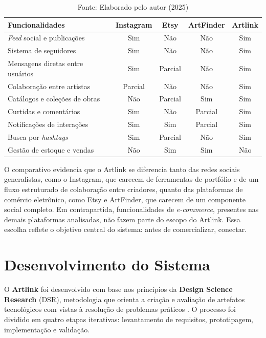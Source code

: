 \documentclass[a4paper, 12pt, oneside]{article}
\begin{document}
\begin{table}[ht]
\centering
\caption{Comparativo entre plataformas para artistas}
\label{tab:comparativo}
\begin{tabular}{|l|c|c|c|c|}
\hline
\textbf{Funcionalidades} & \textbf{Instagram} & \textbf{Etsy} & \textbf{ArtFinder} & \textbf{Artlink} \\ \hline
\textit{Feed} social e publicações  & Sim & Não  & Não   & Sim   \\ \hline
Sistema de seguidores               & Sim & Não  & Não   & Sim   \\ \hline
Mensagens diretas entre usuários    & Sim & Parcial & Não  & Sim  \\ \hline
Colaboração entre artistas          & Parcial & Não  & Não   & Sim   \\ \hline
Catálogos e coleções de obras       & Não & Parcial & Sim  & Sim  \\ \hline
Curtidas e comentários              & Sim & Não  & Parcial & Sim  \\ \hline
Notificações de interações          & Sim & Sim  & Parcial & Sim  \\ \hline
Busca por \textit{hashtags}         & Sim & Parcial & Não  & Sim  \\ \hline
Gestão de estoque e vendas          & Não & Sim  & Sim   & Não   \\ \hline
\end{tabular}
\caption*{Fonte: Elaborado pelo autor (2025)}
\end{table}

O comparativo evidencia que o Artlink se diferencia tanto das redes sociais generalistas, como o Instagram, que carecem de ferramentas de portfólio e de um fluxo estruturado de colaboração entre criadores, quanto das plataformas de comércio eletrônico, como Etsy e ArtFinder, que carecem de um componente social completo. Em contrapartida, funcionalidades de \textit{e-commerce}, presentes nas demais plataformas analisadas, não fazem parte do escopo do Artlink. Essa escolha reflete o objetivo central do sistema: antes de comercializar, conectar.

\section{Desenvolvimento do Sistema}

O \textbf{Artlink} foi desenvolvido com base nos princípios da \textbf{Design Science Research} (DSR), metodologia que orienta a criação e avaliação de artefatos tecnológicos com vistas à resolução de problemas práticos \cite{hevner2004}. O processo foi dividido em quatro etapas iterativas: levantamento de requisitos, prototipagem, implementação e validação.
\end{document}
